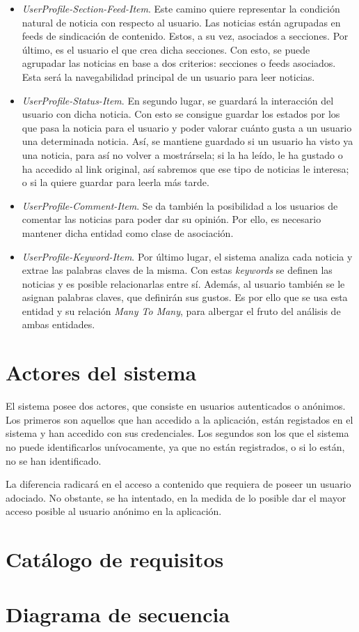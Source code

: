 \begin{itemize}
    \item \textit{UserProfile-Section-Feed-Item}. Este camino quiere representar la condición natural de noticia con respecto al usuario. Las noticias están agrupadas en feeds de sindicación de contenido. Estos, a su vez, asociados a secciones. Por último, es el usuario el que crea dicha secciones. Con esto, se puede agrupadar las noticias en base a dos criterios: secciones o feeds asociados. Esta será la navegabilidad principal de un usuario para leer noticias.
    \item \textit{UserProfile-Status-Item}. En segundo lugar, se guardará la interacción del usuario con dicha noticia. Con esto se consigue guardar los estados por los que pasa la noticia para el usuario y poder valorar cuánto gusta a un usuario una determinada noticia. Así, se mantiene guardado si un usuario ha visto ya una noticia, para así no volver a mostrársela; si la ha leído, le ha gustado o ha accedido al link original, así sabremos que ese tipo de noticias le interesa; o si la quiere guardar para leerla más tarde.
    \item \textit{UserProfile-Comment-Item}. Se da también la posibilidad a los usuarios de comentar las noticias para poder dar su opinión. Por ello, es necesario mantener dicha entidad como clase de asociación.
    \item \textit{UserProfile-Keyword-Item}. Por último lugar, el sistema analiza cada noticia y extrae las palabras claves de la misma. Con estas \textit{keywords} se definen las noticias y es posible relacionarlas entre sí. Además, al usuario también se le asignan palabras claves, que definirán sus gustos. Es por ello que se usa esta entidad y su relación \textit{Many To Many}, para albergar el fruto del análisis de ambas entidades.
\end{itemize}


\section{Actores del sistema}\label{sec:actores del sistema}

El sistema posee dos actores, que consiste en usuarios autenticados o anónimos. Los primeros son aquellos que han accedido a la aplicación, están registados en el sistema y han accedido con sus credenciales. Los segundos son los que el sistema no puede identificarlos unívocamente, ya que no están registrados, o si lo están, no se han identificado.

La diferencia radicará en el acceso a contenido que requiera de poseer un usuario adociado. No obstante, se ha intentado, en la medida de lo posible dar el mayor acceso posible al usuario anónimo en la aplicación.

\section{Catálogo de requisitos}\label{sec:catalogo_requisitos}

\section{Diagrama de secuencia}\label{sec:diagrama_secuencia}